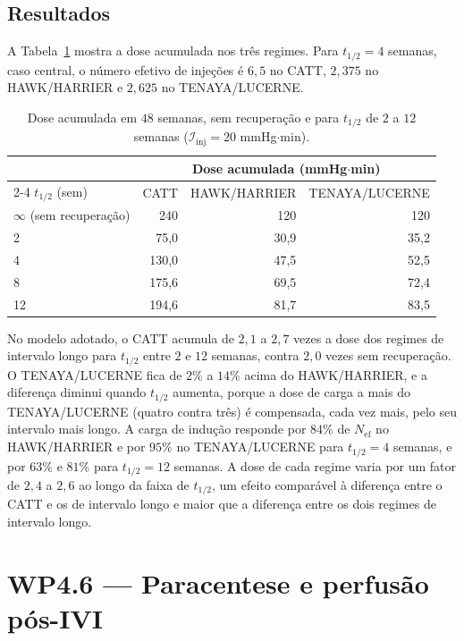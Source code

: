 \subsection{Resultados}

A Tabela~\ref{tab_wp45_cum} mostra a dose acumulada nos três regimes. Para $t_{1/2}=4$ semanas, caso central, o número efetivo de injeções é $6{,}5$ no CATT, $2{,}375$ no HAWK/HARRIER e $2{,}625$ no TENAYA/LUCERNE.

\begin{table}[h]
\centering
\caption{Dose acumulada em $48$ semanas, sem recuperação e para $t_{1/2}$ de $2$ a $12$ semanas ($\mathcal{I}_{\mathrm{inj}}=20$ mmHg$\cdot$min).}
\label{tab_wp45_cum}
\begin{tabular}{@{}lrrr@{}}
\toprule
 & \multicolumn{3}{c}{Dose acumulada (mmHg$\cdot$min)} \\
\cmidrule(l){2-4}
$t_{1/2}$ (sem) & CATT & HAWK/HARRIER & TENAYA/LUCERNE \\
\midrule
$\infty$ (sem recuperação) & 240 & 120 & 120 \\
2 & 75,0 & 30,9 & 35,2 \\
4 & 130,0 & 47,5 & 52,5 \\
8 & 175,6 & 69,5 & 72,4 \\
12 & 194,6 & 81,7 & 83,5 \\
\bottomrule
\end{tabular}
\end{table}

No modelo adotado, o CATT acumula de $2{,}1$ a $2{,}7$ vezes a dose dos regimes de intervalo longo para $t_{1/2}$ entre $2$ e $12$ semanas, contra $2{,}0$ vezes sem recuperação. O TENAYA/LUCERNE fica de $2\%$ a $14\%$ acima do HAWK/HARRIER, e a diferença diminui quando $t_{1/2}$ aumenta, porque a dose de carga a mais do TENAYA/LUCERNE (quatro contra três) é compensada, cada vez mais, pelo seu intervalo mais longo. A carga de indução responde por $84\%$ de $N_{\text{ef}}$ no HAWK/HARRIER e por $95\%$ no TENAYA/LUCERNE para $t_{1/2}=4$ semanas, e por $63\%$ e $81\%$ para $t_{1/2}=12$ semanas. A dose de cada regime varia por um fator de $2{,}4$ a $2{,}6$ ao longo da faixa de $t_{1/2}$, um efeito comparável à diferença entre o CATT e os de intervalo longo e maior que a diferença entre os dois regimes de intervalo longo.

\section{WP4.6 --- Paracentese e perfusão pós-IVI}
\label{sec_wp46}

